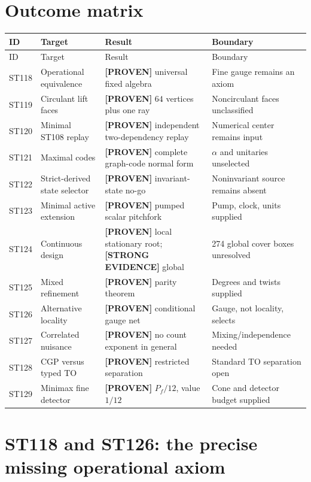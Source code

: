 \documentclass[11pt,a4paper]{article}
\newcommand{\proven}{\textcolor{green!40!black}{\textbf{[PROVEN]}}}
\newcommand{\strong}{\textcolor{blue!70!black}{\textbf{[STRONG EVIDENCE]}}}
\begin{document}
\section{Outcome matrix}
\small
\begin{longtable}{@{}p{}p{}p{}p{}@{}}
\toprule ID & Target & Result & Boundary\\\midrule\endfirsthead
\toprule ID & Target & Result & Boundary\\\midrule\endhead
ST118 & Operational equivalence & \proven{} universal fixed algebra & Fine gauge remains an axiom\\
ST119 & Circulant lift faces & \proven{} $64$ vertices plus one ray & Noncirculant faces unclassified\\
ST120 & Minimal ST108 replay & \proven{} independent two-dependency replay & Numerical center remains input\\
ST121 & Maximal codes & \proven{} complete graph-code normal form & $\alpha$ and unitaries unselected\\
ST122 & Strict-derived state selector & \proven{} invariant-state no-go & Noninvariant source remains absent\\
ST123 & Minimal active extension & \proven{} pumped scalar pitchfork & Pump, clock, units supplied\\
ST124 & Continuous design & \proven{} local stationary root; \strong{} global & 274 global cover boxes unresolved\\
ST125 & Mixed refinement & \proven{} parity theorem & Degrees and twists supplied\\
ST126 & Alternative locality & \proven{} conditional gauge net & Gauge, not locality, selects\\
ST127 & Correlated nuisance & \proven{} no count exponent in general & Mixing/independence needed\\
ST128 & CGP versus typed TO & \proven{} restricted separation & Standard TO separation open\\
ST129 & Minimax fine detector & \proven{} $P_f/12$, value $1/12$ & Cone and detector budget supplied\\
\bottomrule
\end{longtable}
\normalsize

\section{ST118 and ST126: the precise missing operational axiom}
\end{document}
